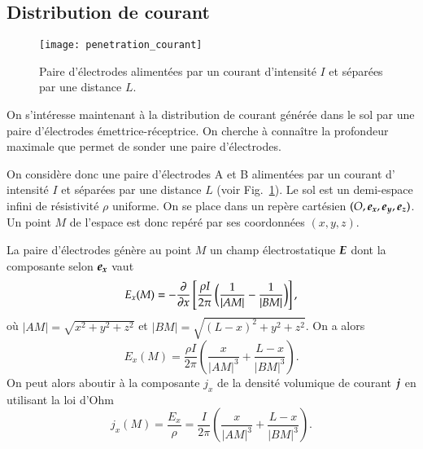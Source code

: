 \subsection{Distribution de courant}
\begin{figure}[]
	\centering
	\texttt{[image: penetration\_courant]}
	\caption{Paire d'électrodes alimentées par un courant d'intensité $I$
		 et séparées par une distance $L$.}%
	\label{fig:penetration_courant}
\end{figure}
On s'intéresse maintenant à la distribution de courant générée dans le sol
par une paire d'électrodes émettrice-réceptrice. On cherche à connaître la 
profondeur maximale que permet de sonder une paire d'électrodes. 

On considère donc une paire d'électrodes A et B alimentées par un courant d'
intensité $I$ et séparées 
par une distance $L$ (voir Fig.~\ref{fig:penetration_courant}). 
Le sol est un demi-espace infini de résistivité $\rho$ uniforme. 
On se place dans un repère cartésien $(O, \ex, \ey, \ez)$. Un point $M$ de l'espace
est donc repéré par ses coordonnées $(x, y, z)$.

La paire d'électrodes génère au point $M$ un champ électrostatique $\vece$ dont
la composante selon $\ex$ vaut
\begin{equation*}
	E_x(M) = - \dfrac{\partial}{\partial x}\left[\dfrac{\rho I}{2 \pi} 
	\left( \dfrac{1}{|AM|} - \dfrac{1}{|BM|}\right)\right],
\end{equation*}
où $|AM| = \sqrt{x^2 + y^2 + z^2}$ et $|BM| = \sqrt{(L - x)^2 + y^2 + z^2}$.
On a alors
\begin{equation*}
	E_x(M) = \dfrac{\rho I}{2 \pi}\left(\dfrac{x}{|AM|^3} 
	    + \dfrac{L - x}{|BM|^3}\right).
\end{equation*}
On peut alors aboutir à la composante $j_x$ de la densité volumique de courant
$\vecj$ en utilisant la loi d'Ohm
\begin{equation}
	j_x(M) = \dfrac{E_x}{\rho} = \dfrac{I}{2 \pi}\left(\dfrac{x}{|AM|^3} 
	    + \dfrac{L - x}{|BM|^3}\right).
\end{equation}

